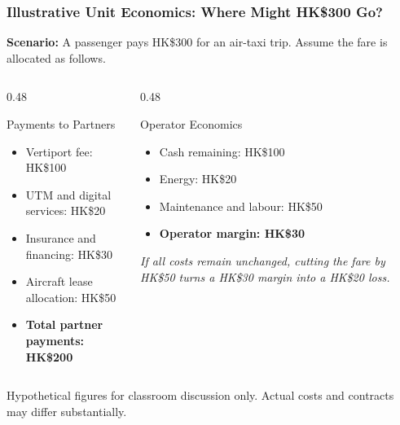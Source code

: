 \documentclass{beamer}
\begin{document}
\begin{frame}[t, shrink=10]
  \frametitle{Illustrative Unit Economics: Where Might HK\$300 Go?}
  \textbf{Scenario:} A passenger pays HK\$300 for an air-taxi trip. Assume the fare is allocated as follows.
  \begin{columns}[T]
    \begin{column}{0.48\textwidth}
      \begin{block}{Payments to Partners}
      \begin{itemize}
        \item Vertiport fee: HK\$100
        \item UTM and digital services: HK\$20
        \item Insurance and financing: HK\$30
        \item Aircraft lease allocation: HK\$50
        \item \textbf{Total partner payments: HK\$200}
      \end{itemize}
      \end{block}
    \end{column}
    \begin{column}{0.48\textwidth}
      \begin{block}{Operator Economics}
      \begin{itemize}
        \item Cash remaining: HK\$100
        \item Energy: HK\$20
        \item Maintenance and labour: HK\$50
        \item \textbf{Operator margin: HK\$30}
      \end{itemize}
      \end{block}
      \textit{If all costs remain unchanged, cutting the fare by HK\$50 turns a HK\$30 margin into a HK\$20 loss.}
    \end{column}
  \end{columns}
  \vfill
  {\tiny Hypothetical figures for classroom discussion only. Actual costs and contracts may differ substantially.}
\end{frame}
\end{document}
